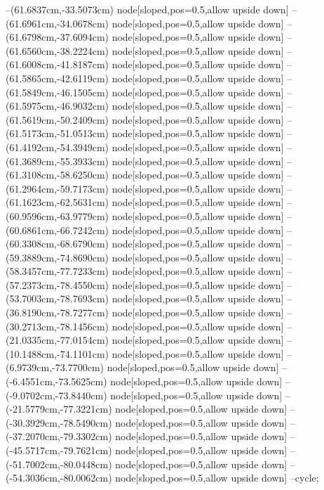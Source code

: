 --(61.6837cm,-33.5073cm) node[sloped,pos=0.5,allow upside down]{\ArrowIn}
--(61.6961cm,-34.0678cm) node[sloped,pos=0.5,allow upside down]{\arrowIn}
--(61.6798cm,-37.6094cm) node[sloped,pos=0.5,allow upside down]{\ArrowIn}
--(61.6560cm,-38.2224cm) node[sloped,pos=0.5,allow upside down]{\arrowIn}
--(61.6008cm,-41.8187cm) node[sloped,pos=0.5,allow upside down]{\ArrowIn}
--(61.5865cm,-42.6119cm) node[sloped,pos=0.5,allow upside down]{\arrowIn}
--(61.5849cm,-46.1505cm) node[sloped,pos=0.5,allow upside down]{\ArrowIn}
--(61.5975cm,-46.9032cm) node[sloped,pos=0.5,allow upside down]{\arrowIn}
--(61.5619cm,-50.2409cm) node[sloped,pos=0.5,allow upside down]{\ArrowIn}
--(61.5173cm,-51.0513cm) node[sloped,pos=0.5,allow upside down]{\arrowIn}
--(61.4192cm,-54.3949cm) node[sloped,pos=0.5,allow upside down]{\ArrowIn}
--(61.3689cm,-55.3933cm) node[sloped,pos=0.5,allow upside down]{\arrowIn}
--(61.3108cm,-58.6250cm) node[sloped,pos=0.5,allow upside down]{\ArrowIn}
--(61.2964cm,-59.7173cm) node[sloped,pos=0.5,allow upside down]{\ArrowIn}
--(61.1623cm,-62.5631cm) node[sloped,pos=0.5,allow upside down]{\ArrowIn}
--(60.9596cm,-63.9779cm) node[sloped,pos=0.5,allow upside down]{\ArrowIn}
--(60.6861cm,-66.7242cm) node[sloped,pos=0.5,allow upside down]{\ArrowIn}
--(60.3308cm,-68.6790cm) node[sloped,pos=0.5,allow upside down]{\ArrowIn}
--(59.3889cm,-74.8690cm) node[sloped,pos=0.5,allow upside down]{\ArrowIn}
--(58.3457cm,-77.7233cm) node[sloped,pos=0.5,allow upside down]{\ArrowIn}
--(57.2373cm,-78.4550cm) node[sloped,pos=0.5,allow upside down]{\ArrowIn}
--(53.7003cm,-78.7693cm) node[sloped,pos=0.5,allow upside down]{\ArrowIn}
--(36.8190cm,-78.7277cm) node[sloped,pos=0.5,allow upside down]{\ArrowIn}
--(30.2713cm,-78.1456cm) node[sloped,pos=0.5,allow upside down]{\ArrowIn}
--(21.0335cm,-77.0154cm) node[sloped,pos=0.5,allow upside down]{\ArrowIn}
--(10.1488cm,-74.1101cm) node[sloped,pos=0.5,allow upside down]{\ArrowIn}
--(6.9739cm,-73.7700cm) node[sloped,pos=0.5,allow upside down]{\ArrowIn}
--(-6.4551cm,-73.5625cm) node[sloped,pos=0.5,allow upside down]{\ArrowIn}
--(-9.0702cm,-73.8440cm) node[sloped,pos=0.5,allow upside down]{\ArrowIn}
--(-21.5779cm,-77.3221cm) node[sloped,pos=0.5,allow upside down]{\ArrowIn}
--(-30.3929cm,-78.5490cm) node[sloped,pos=0.5,allow upside down]{\ArrowIn}
--(-37.2070cm,-79.3302cm) node[sloped,pos=0.5,allow upside down]{\ArrowIn}
--(-45.5717cm,-79.7621cm) node[sloped,pos=0.5,allow upside down]{\ArrowIn}
--(-51.7002cm,-80.0448cm) node[sloped,pos=0.5,allow upside down]{\ArrowIn}
--(-54.3036cm,-80.0062cm) node[sloped,pos=0.5,allow upside down]{\ArrowIn}
--cycle;

